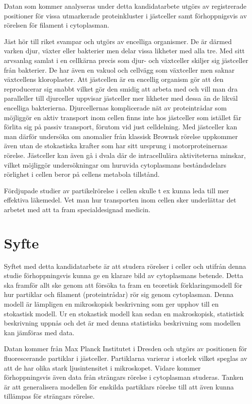 Datan som kommer analyseras under detta kandidatarbete utgörs av registrerade positioner för vissa utmarkerade proteinkluster i jästceller samt förhoppnigsvis av rörelsen för filament i cytoplasman. 

Jäst hör till riket svampar och utgörs av encelliga organismer. De är därmed varken djur, växter eller bakterier men delar vissa likheter med alla tre. Med sitt arvsanlag samlat i en cellkärna precis som djur- och växtceller skiljer sig jästceller från bakterier. De har även en vakuol och cellvägg som växtceller men saknar växtcellens kloroplaster. Att jästcellen är en encellig organism gör att den reproducerar sig snabbt vilket gör den smidig att arbeta med och vill man dra paralleller till djurceller uppvisar jästceller mer likheter med dessa än de likväl encelliga bakterierna. Djurcellernas komplicerade nät av proteintrådar som möjliggör en aktiv transport inom cellen finns inte hos jästceller som istället får förlita sig på passiv transport, förutom vid just celldelning. Med jästceller kan man därför undersöka om anomalier från klassisk Brownsk rörelse uppkommer även utan de stokastiska krafter som har sitt ursprung i motorproteinernas rörelse. Jästceller kan även gå i dvala där de intracellulära aktiviteterna minskar, vilket möjliggör undersökningar om huruvida cytoplasmans beståndsdelars rörlighet i cellen beror på cellens metabola tillstånd. \cite{Yeast}

Fördjupade studier av partikelrörelse i cellen skulle t ex kunna leda till mer effektiva läkemedel. Vet man hur transporten inom cellen sker underlättar det arbetet med att ta fram specialdesignad medicin.


\section{Syfte}

Syftet med detta kandidatarbete är att studera rörelser i celler och utifrån denna studie förhoppningsvis kunna ge en klarare bild av cytoplasmans betende. Detta ska framför allt ske genom att försöka ta fram en teoretisk förklaringsmodell för hur partiklar och filament (proteintrådar) rör sig genom cytoplasman. Denna modell är lämpligen en mikroskopisk beskrivning som ger upphov till en stokastisk modell. Ur en stokastisk modell kan sedan en makroskopisk, statistisk beskrivning uppnås och det är med denna statistiska beskrivning som modellen kan jämföras med data. 

Datan kommer från Max Planck Institutet i Dresden och utgörs av positionen för fluorescerande partiklar i jästceller. Partiklarna varierar i storlek vilket speglas av att de har olika stark ljusintensitet i mikroskopet. 
Vidare kommer förhoppningsvis även data från strängars rörelse i cytoplasman studeras. Tanken är att generalisera modellen för enskilda partiklars rörelse till att även kunna tillämpas för strängars rörelse.

